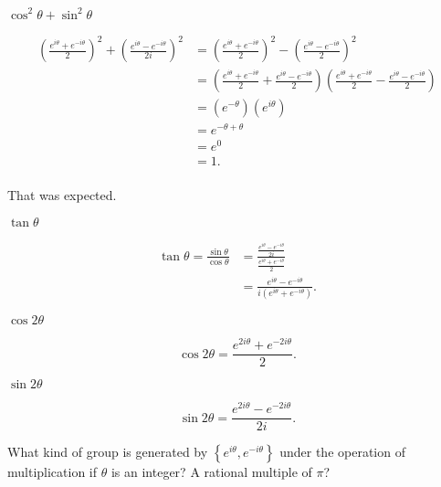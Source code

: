 \documentclass[../key.tex]{subfiles}
\begin{document}
\begin{inner_problem}[start=1]
\item $\cos^2\theta + \sin^2\theta$
\end{inner_problem}

\begin{align*}
\left(\frac{e^{i\theta} + e^{-i\theta}}{2}\right)^2 + \left(\frac{e^{i\theta} - e^{-i\theta}}{2i}\right)^2 &= \left(\frac{e^{i\theta} + e^{-i\theta}}{2}\right)^2 - \left(\frac{e^{i\theta} - e^{-i\theta}}{2}\right)^2 \\
&= \left(\frac{e^{i\theta} + e^{-i\theta}}{2} + \frac{e^{i\theta} - e^{-i\theta}}{2}\right)\left(\frac{e^{i\theta} + e^{-i\theta}}{2} - \frac{e^{i\theta} - e^{-i\theta}}{2}\right) \\
&= \left( e^{-\theta} \right)\left( e^{i\theta} \right) \\
&= e^{-\theta + \theta} \\
&= e^0 \\
&= 1. \\
\end{align*}

That was expected.

\begin{inner_problem}
\item $\tan\theta$
\end{inner_problem}

\begin{align*}
\tan\theta = \frac{\sin\theta}{\cos\theta} &= \frac{\frac{e^{i\theta} - e^{-i\theta}}{2i}}{\frac{e^{i\theta} + e^{-i\theta}}{2}} \\
&= \frac{e^{i\theta} - e^{-i\theta}}{i(e^{i\theta}+e^{-i\theta})}.
\end{align*}

\begin{inner_problem}
\item $\cos 2\theta$
\end{inner_problem}

$$\cos 2\theta = \frac{e^{2i\theta} + e^{-2i\theta}}{2}.$$

\begin{inner_problem}
\item $\sin 2\theta$
\end{inner_problem}

$$\sin 2\theta = \frac{e^{2i\theta} - e^{-2i\theta}}{2i}.$$

\begin{inner_problem}
\item What kind of group is generated by $\left\{e^{i\theta}, e^{-i\theta}\right\}$ under the operation of multiplication if $\theta$ is an integer? A rational multiple of $\pi$?
\end{inner_problem}
\end{document}
